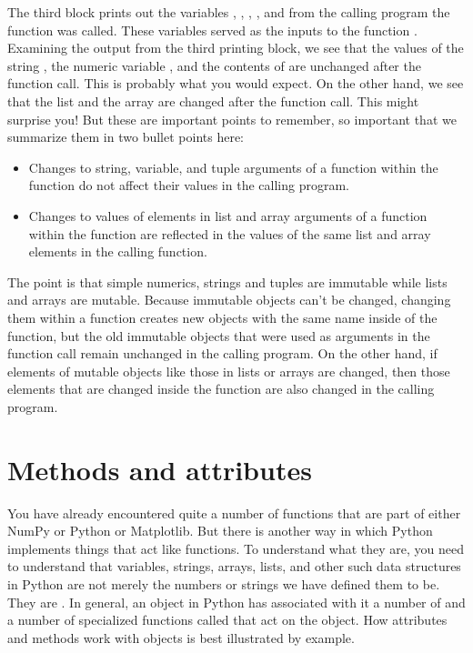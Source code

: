 \documentclass[letterpaper,10pt,english]{sphinxmanual}
\begin{document}
\sphinxAtStartPar
The third block prints out the variables , , , , and  from the calling program  the function  was called.  These variables served as the inputs to the function .  Examining the output from the third printing block, we see that the values of the string , the numeric variable , and the contents of  are unchanged after the function call.  This is probably what you would expect.  On the other hand, we see that the list  and the array  are changed after the function call.  This might surprise you!  But these are important points to remember, so important that we summarize them in two bullet points here:
\begin{itemize}
\item {} 
\sphinxAtStartPar
Changes to string, variable, and tuple arguments of a function within the function do not affect their values in the calling program.

\item {} 
\sphinxAtStartPar
Changes to values of elements in list and array arguments of a function within the function are reflected in the values of the same list and array elements in the calling function.

\end{itemize}

\sphinxAtStartPar
The point is that simple numerics, strings and tuples are immutable while lists and arrays are mutable.  Because immutable objects can’t be changed, changing them within a function creates new objects with the same name inside of the function, but the old immutable objects that were used as arguments in the function call remain unchanged in the calling program.  On the other hand, if elements of mutable objects like those in lists or arrays are changed, then those elements that are changed inside the function are also changed in the calling program.


\section{Methods and attributes}
\label{\detokenize{chap7/chap7_funcs:methods-and-attributes}}
\sphinxAtStartPar
You have already encountered quite a number of functions that are part of either NumPy or Python or Matplotlib.  But there is another way in which Python implements things that act like functions.  To understand what they are, you need to understand that variables, strings, arrays, lists, and other such data structures in Python are not merely the numbers or strings we have defined them to be.  They are .  In general, an object in Python has associated with it a number of  and a number of specialized functions called  that act on the object.  How attributes and methods work with objects is best illustrated by example.
\end{document}

